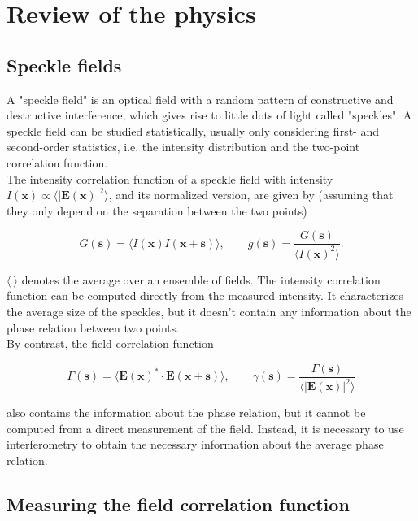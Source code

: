 \section{Review of the physics}

\subsection{Speckle fields} \label{speckles}

A "speckle field" is an optical field with a random pattern of constructive and destructive interference, which gives rise to little dots of light called "speckles". 
A speckle field can be studied statistically, usually only considering first- and second-order statistics, i.e. the intensity distribution and the two-point 
correlation function. \\

The intensity correlation function of a speckle field with intensity $I(\bm x) \propto \langle |\bm E(\bm x)|^2 \rangle$, and its 
normalized version, are given by (assuming that they only depend on the separation between the two points)

\begin{equation}
    G(\bm s) = \langle I(\bm x)I(\bm x + \bm s) \rangle, \qquad g(\bm s) = \frac{G(\bm s)}{\langle I(\bm x)^2 \rangle}.
\end{equation}

$\langle \ \rangle$ denotes the average over an ensemble of fields. The intensity correlation function can be computed directly from the measured intensity. 
It characterizes the average size of the speckles, but it doesn't contain any information about the phase relation between two points. \\

By contrast, the field correlation function

\begin{equation}
    \Gamma(\bm s) = \langle \bm E(\bm x)^* \cdot \bm E(\bm x + \bm s)\rangle, \qquad \gamma(\bm s) = \frac{\Gamma(\bm s)}{\langle |\bm E(\bm x)|^2 \rangle}
\end{equation}

also contains the information about the phase relation, but it cannot be computed from a direct measurement of the field. Instead, it is necessary to use 
interferometry to obtain the necessary information about the average phase relation. 

\subsection{Measuring the field correlation function} \label{meas_corr}

